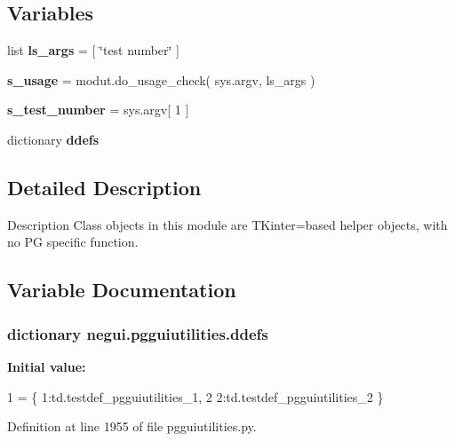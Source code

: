 \subsection*{Variables}
\begin{DoxyCompactItemize}
\item 
list {\bfseries ls\+\_\+args} = \mbox{[} \char`\"{}test number\char`\"{} \mbox{]}\hypertarget{namespacenegui_1_1pgguiutilities_a46e745e9f96185d89c4b1e47e9e9cfbe}{}\label{namespacenegui_1_1pgguiutilities_a46e745e9f96185d89c4b1e47e9e9cfbe}

\item 
{\bfseries s\+\_\+usage} = modut.\+do\+\_\+usage\+\_\+check( sys.\+argv, ls\+\_\+args )\hypertarget{namespacenegui_1_1pgguiutilities_ac555db6439aacbf9bbcf963914197974}{}\label{namespacenegui_1_1pgguiutilities_ac555db6439aacbf9bbcf963914197974}

\item 
{\bfseries s\+\_\+test\+\_\+number} = sys.\+argv\mbox{[} 1 \mbox{]}\hypertarget{namespacenegui_1_1pgguiutilities_a27a6c48cffe2fc5f9023b47cd8a33c45}{}\label{namespacenegui_1_1pgguiutilities_a27a6c48cffe2fc5f9023b47cd8a33c45}

\item 
dictionary {\bfseries ddefs}
\end{DoxyCompactItemize}


\subsection{Detailed Description}
\begin{DoxyVerb}Description
Class objects in this module are TKinter=based
helper objects, with no PG specific function.
\end{DoxyVerb}
 

\subsection{Variable Documentation}
\subsubsection[{\texorpdfstring{ddefs}{ddefs}}]{\setlength{\rightskip}{0pt plus 5cm}dictionary negui.\+pgguiutilities.\+ddefs}\hypertarget{namespacenegui_1_1pgguiutilities_a6d79494ef4549443848626c0def2e0a6}{}\label{namespacenegui_1_1pgguiutilities_a6d79494ef4549443848626c0def2e0a6}
{\bfseries Initial value\+:}
\begin{DoxyCode}
1 = \{ 1:td.testdef\_pgguiutilities\_1,
2             2:td.testdef\_pgguiutilities\_2 \}
\end{DoxyCode}


Definition at line 1955 of file pgguiutilities.\+py.

